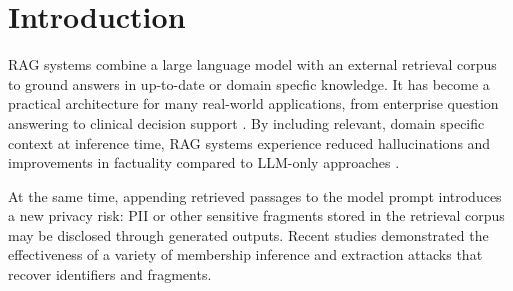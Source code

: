 
\chapter{Introduction}\label{chapter:introduction}








\ac{RAG} systems combine a large language model with an external retrieval corpus to ground answers in up-to-date or domain specfic knowledge. It has become a practical architecture for many real-world applications, from enterprise question answering to clinical decision support  \cite{chatDoctor}. By including relevant, domain specific context at inference time, RAG systems experience reduced hallucinations \cite{ragNoHallucination} and improvements in factuality compared to LLM-only approaches  \cite{ragOrigin}.

At  the same time, appending retrieved passages to the model prompt introduces a new privacy risk: \ac{PII} or other sensitive fragments stored in the retrieval corpus may be disclosed through generated outputs. Recent studies demonstrated the effectiveness of a variety of membership inference and extraction attacks that recover identifiers and fragments. \cite{goodAndBad,ragThief,ragMIA,generatingIsBelieving,DEAL}

